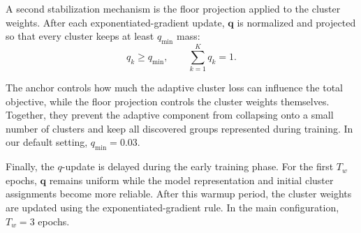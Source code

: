 A second stabilization mechanism is the floor projection applied to the cluster
weights. After each exponentiated-gradient update, \(\mathbf{q}\) is normalized and
projected so that every cluster keeps at least \(q_{\min}\) mass:
\begin{equation}
    q_k \ge q_{\min}, \qquad \sum_{k=1}^{K} q_k = 1.
    \label{eq:floor}
\end{equation}

The anchor controls how much the adaptive cluster loss can influence the total objective,
while the floor projection controls the cluster weights themselves. Together, they
prevent the adaptive component from collapsing onto a small number of clusters and keep
all discovered groups represented during training. In our default setting,
\(q_{\min}=0.03\).

Finally, the \(q\)-update is delayed during the early training phase. For the first
\(T_w\) epochs, \(\mathbf{q}\) remains uniform while the model representation and
initial cluster assignments become more reliable. After this warmup period, the
cluster weights are updated using the exponentiated-gradient rule. In the main
configuration, \(T_w=3\) epochs.
